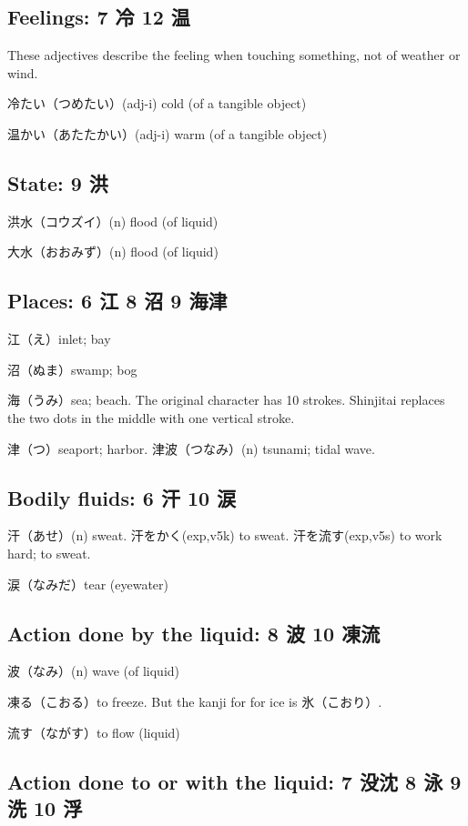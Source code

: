 \subsection{Feelings: 7 冷 12 温}

These adjectives describe the feeling when
touching something, not of weather or wind.

冷たい（つめたい）(adj-i) cold (of a tangible object)

温かい（あたたかい）(adj-i) warm (of a tangible object)

\subsection{State: 9 洪}

洪水（コウズイ）(n) flood (of liquid)

大水（おおみず）(n) flood (of liquid)

\subsection{Places: 6 江 8 沼 9 海津}

江（え）inlet; bay

沼（ぬま）swamp; bog

海（うみ）sea; beach.
The original character has 10 strokes.
Shinjitai replaces the two dots in the middle
with one vertical stroke.

津（つ）seaport; harbor.
津波（つなみ）(n) tsunami; tidal wave.

\subsection{Bodily fluids: 6 汗 10 涙}

汗（あせ）(n) sweat.
汗をかく(exp,v5k) to sweat.
汗を流す(exp,v5s) to work hard; to sweat.

涙（なみだ）tear (eyewater)

\subsection{Action done by the liquid: 8 波 10 凍流}

波（なみ）(n) wave (of liquid)

凍る（こおる）to freeze.
But the kanji for for ice is 氷（こおり）.

流す（ながす）to flow (liquid)

\subsection{Action done to or with the liquid: 7 没沈 8 泳 9 洗 10 浮}

